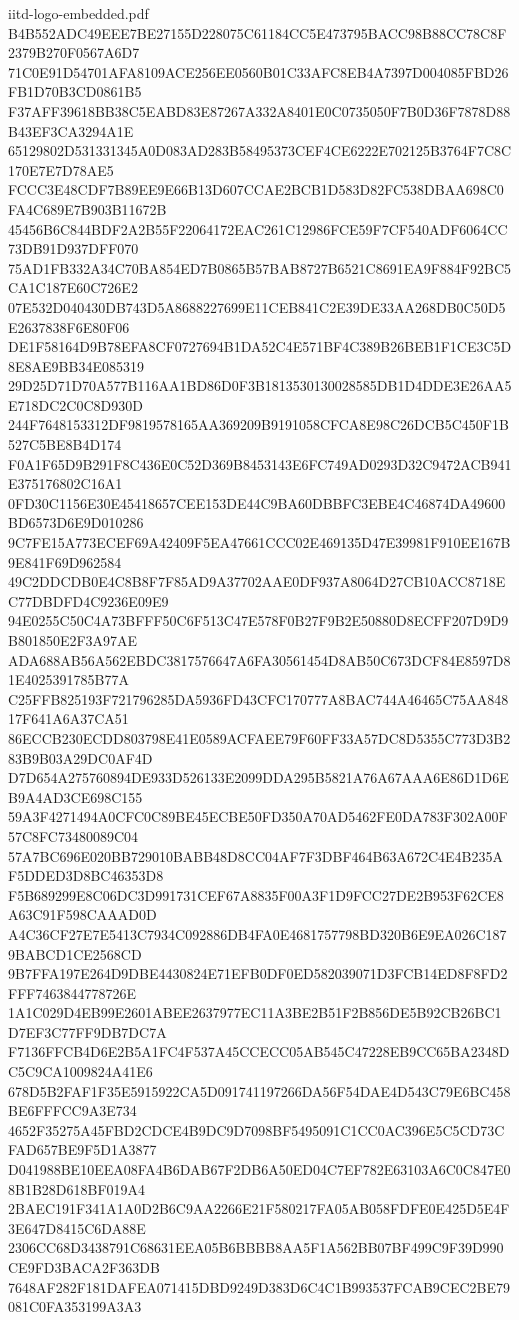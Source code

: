 \begin{filecontents*}[overwrite]{iitd-logo-embedded.pdf}
B4B552ADC49EEE7BE27155D228075C61184CC5E473795BACC98B88CC78C8F2379B270F0567A6D7
71C0E91D54701AFA8109ACE256EE0560B01C33AFC8EB4A7397D004085FBD26FB1D70B3CD0861B5
F37AFF39618BB38C5EABD83E87267A332A8401E0C0735050F7B0D36F7878D88B43EF3CA3294A1E
65129802D531331345A0D083AD283B58495373CEF4CE6222E702125B3764F7C8C170E7E7D78AE5
FCCC3E48CDF7B89EE9E66B13D607CCAE2BCB1D583D82FC538DBAA698C0FA4C689E7B903B11672B
45456B6C844BDF2A2B55F22064172EAC261C12986FCE59F7CF540ADF6064CC73DB91D937DFF070
75AD1FB332A34C70BA854ED7B0865B57BAB8727B6521C8691EA9F884F92BC5CA1C187E60C726E2
07E532D040430DB743D5A8688227699E11CEB841C2E39DE33AA268DB0C50D5E2637838F6E80F06
DE1F58164D9B78EFA8CF0727694B1DA52C4E571BF4C389B26BEB1F1CE3C5D8E8AE9BB34E085319
29D25D71D70A577B116AA1BD86D0F3B1813530130028585DB1D4DDE3E26AA5E718DC2C0C8D930D
244F7648153312DF9819578165AA369209B9191058CFCA8E98C26DCB5C450F1B527C5BE8B4D174
F0A1F65D9B291F8C436E0C52D369B8453143E6FC749AD0293D32C9472ACB941E375176802C16A1
0FD30C1156E30E45418657CEE153DE44C9BA60DBBFC3EBE4C46874DA49600BD6573D6E9D010286
9C7FE15A773ECEF69A42409F5EA47661CCC02E469135D47E39981F910EE167B9E841F69D962584
49C2DDCDB0E4C8B8F7F85AD9A37702AAE0DF937A8064D27CB10ACC8718EC77DBDFD4C9236E09E9
94E0255C50C4A73BFFF50C6F513C47E578F0B27F9B2E50880D8ECFF207D9D9B801850E2F3A97AE
ADA688AB56A562EBDC3817576647A6FA30561454D8AB50C673DCF84E8597D81E4025391785B77A
C25FFB825193F721796285DA5936FD43CFC170777A8BAC744A46465C75AA84817F641A6A37CA51
86ECCB230ECDD803798E41E0589ACFAEE79F60FF33A57DC8D5355C773D3B283B9B03A29DC0AF4D
D7D654A275760894DE933D526133E2099DDA295B5821A76A67AAA6E86D1D6EB9A4AD3CE698C155
59A3F4271494A0CFC0C89BE45ECBE50FD350A70AD5462FE0DA783F302A00F57C8FC73480089C04
57A7BC696E020BB729010BABB48D8CC04AF7F3DBF464B63A672C4E4B235AF5DDED3D8BC46353D8
F5B689299E8C06DC3D991731CEF67A8835F00A3F1D9FCC27DE2B953F62CE8A63C91F598CAAAD0D
A4C36CF27E7E5413C7934C092886DB4FA0E4681757798BD320B6E9EA026C1879BABCD1CE2568CD
9B7FFA197E264D9DBE4430824E71EFB0DF0ED582039071D3FCB14ED8F8FD2FFF7463844778726E
1A1C029D4EB99E2601ABEE2637977EC11A3BE2B51F2B856DE5B92CB26BC1D7EF3C77FF9DB7DC7A
F7136FFCB4D6E2B5A1FC4F537A45CCECC05AB545C47228EB9CC65BA2348DC5C9CA1009824A41E6
678D5B2FAF1F35E5915922CA5D091741197266DA56F54DAE4D543C79E6BC458BE6FFFCC9A3E734
4652F35275A45FBD2CDCE4B9DC9D7098BF5495091C1CC0AC396E5C5CD73CFAD657BE9F5D1A3877
D041988BE10EEA08FA4B6DAB67F2DB6A50ED04C7EF782E63103A6C0C847E08B1B28D618BF019A4
2BAEC191F341A1A0D2B6C9AA2266E21F580217FA05AB058FDFE0E425D5E4F3E647D8415C6DA88E
2306CC68D3438791C68631EEA05B6BBBB8AA5F1A562BB07BF499C9F39D990CE9FD3BACA2F363DB
7648AF282F181DAFEA071415DBD9249D383D6C4C1B993537FCAB9CEC2BE79081C0FA353199A3A3

\end{filecontents*}
